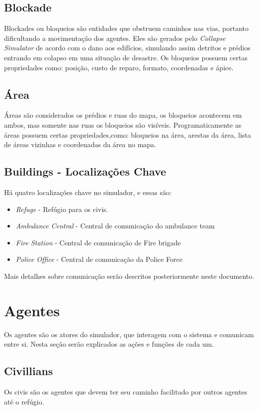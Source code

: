 \documentclass[conference]{IEEEtran}
\begin{document}
\subsection{Blockade}
Blockades ou bloqueios são entidades que obstruem caminhos nas vias, portanto dificultando a movimentação dos agentes.
Eles são gerados pelo \textit{Collapse Simulator} de acordo com o dano aos edifícios, simulando assim detritos e prédios entrando em colapso em uma situação de desastre. Os bloqueios possuem certas propriedades como: posição, custo de reparo, formato, coordenadas e ápice.

\subsection{Área}
Áreas são considerados os prédios e ruas do mapa, os bloqueios acontecem em ambos, mas somente nas ruas os bloqueios são visíveis. Programaticamente as áreas possuem certas propriedades,como: bloqueios na área, arestas da área, lista de áreas vizinhas e coordenadas da área no mapa.
\subsection{Buildings - Localizações Chave}
Há quatro localizações chave no simulador, e essas são:
\begin{itemize}
\item \textit {Refuge} - Refúgio para os civis.
\item \textit {Ambulance Central} - Central de comunicação do ambulance team
\item \textit {Fire Station} - Central de comunicação de Fire brigade
\item \textit {Police Office} - Central de comunicação da Police Force
\end{itemize}
Mais detalhes sobre comunicação serão descritos posteriormente neste documento.


\section{Agentes}
Os agentes são os atores do simulador, que interagem com o sistema e comunicam entre si. Nesta seção serão explicados as ações e funções de cada um.
\subsection{Civillians}
Os civis são os agentes que devem ter seu caminho facilitado por outros agentes até o refúgio.
\end{document}
